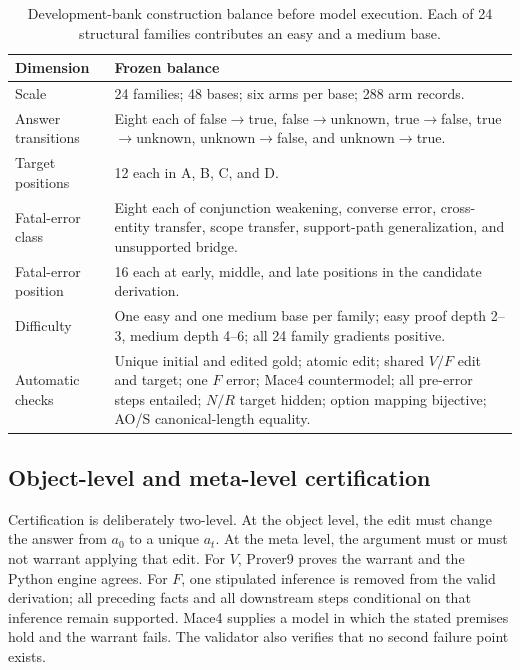 \documentclass[letterpaper]{article}
\begin{document}
\begin{table}[t]
\centering
\small
\begin{tabular}{L{3.0cm}L{10.7cm}}
\toprule
Dimension & Frozen balance \\
\midrule
Scale & 24 families; 48 bases; six arms per base; 288 arm records. \\
Answer transitions & Eight each of false$\rightarrow$true, false$\rightarrow$unknown, true$\rightarrow$false, true$\rightarrow$unknown, unknown$\rightarrow$false, and unknown$\rightarrow$true. \\
Target positions & 12 each in A, B, C, and D. \\
Fatal-error class & Eight each of conjunction weakening, converse error, cross-entity transfer, scope transfer, support-path generalization, and unsupported bridge. \\
Fatal-error position & 16 each at early, middle, and late positions in the candidate derivation. \\
Difficulty & One easy and one medium base per family; easy proof depth 2--3, medium depth 4--6; all 24 family gradients positive. \\
Automatic checks & Unique initial and edited gold; atomic edit; shared $V/F$ edit and target; one $F$ error; Mace4 countermodel; all pre-error steps entailed; $N/R$ target hidden; option mapping bijective; AO/S canonical-length equality. \\
\bottomrule
\end{tabular}
\caption{Development-bank construction balance before model execution. Each of 24 structural families contributes an easy and a medium base.}
\label{tab:supp-data-balance}
\end{table}

\subsection{Object-level and meta-level certification}

Certification is deliberately two-level.  At the object level, the edit must change the answer from $a_0$ to a unique $a_t$.  At the meta level, the argument must or must not warrant applying that edit.  For $V$, Prover9 proves the warrant and the Python engine agrees.  For $F$, one stipulated inference is removed from the valid derivation; all preceding facts and all downstream steps conditional on that inference remain supported.  Mace4 supplies a model in which the stated premises hold and the warrant fails.  The validator also verifies that no second failure point exists.
\end{document}

